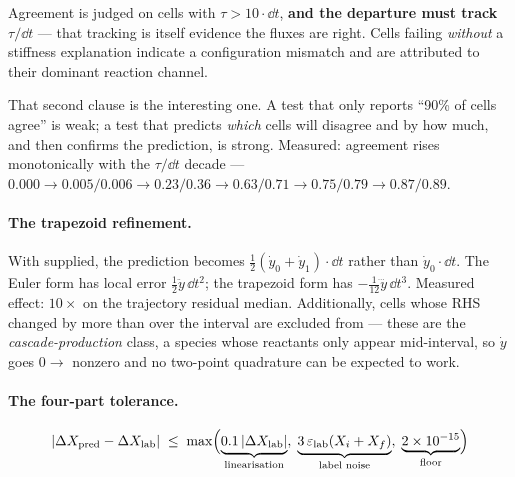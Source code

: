 \begin{invariant}
Agreement is judged on cells with $\tau > 10\cdot \dd t$, \textbf{and the
departure must track $\tau/\dd t$} --- that tracking is itself evidence the
fluxes are right. Cells failing \emph{without} a stiffness explanation indicate
a configuration mismatch and are attributed to their dominant reaction channel.
\end{invariant}

That second clause is the interesting one. A test that only reports ``90\% of
cells agree'' is weak; a test that predicts \emph{which} cells will disagree and
by how much, and then confirms the prediction, is strong. Measured: agreement
rises monotonically with the $\tau/\dd t$ decade ---
$0.000 \to 0.005/0.006 \to 0.23/0.36 \to 0.63/0.71 \to 0.75/0.79 \to
0.87/0.89$. 

\paragraph{The trapezoid refinement.} With  supplied, the
prediction becomes $\tfrac12(\dot y_0 + \dot y_1)\cdot \dd t$ rather than
$\dot y_0\cdot \dd t$. The Euler form has local error
$\tfrac12\ddot y\,\dd t^2$; the trapezoid form has
$-\tfrac{1}{12}\dddot y\,\dd t^3$. Measured effect: $10\times$ on the trajectory
residual median. Additionally, cells whose RHS changed by more than
 over the interval are excluded from
 --- these are the \emph{cascade-production} class, a species
whose reactants only appear mid-interval, so $\dot y$ goes $0 \to$ nonzero and
no two-point quadrature can be expected to work.

\paragraph{The four-part tolerance.}
%
\begin{equation}
|\Delta X_{\mathrm{pred}} - \Delta X_{\mathrm{lab}}| \;\le\;
\max\Bigl(\underbrace{0.1\,|\Delta X_{\mathrm{lab}}|}_{\text{linearisation}},\;
\underbrace{3\,\varepsilon_{\mathrm{lab}}(X_i + X_f)}_{\text{label noise}},\;
\underbrace{2\times10^{-15}}_{\text{floor}}\Bigr)
\label{eq:handshaketol}
\end{equation}


